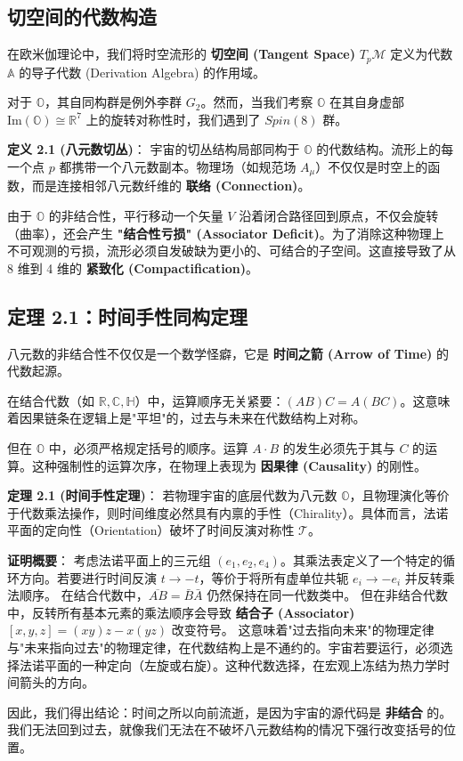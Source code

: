\subsection{切空间的代数构造}

在欧米伽理论中，我们将时空流形的 \textbf{切空间 (Tangent Space)} $T_p \mathcal{M}$ 定义为代数 $\mathbb{A}$ 的导子代数 (Derivation Algebra) 的作用域。

对于 $\mathbb{O}$，其自同构群是例外李群 $G_2$。然而，当我们考察 $\mathbb{O}$ 在其自身虚部 $\text{Im}(\mathbb{O}) \cong \mathbb{R}^7$ 上的旋转对称性时，我们遇到了 $Spin(8)$ 群。

\textbf{定义 2.1 (八元数切丛)}：
宇宙的切丛结构局部同构于 $\mathbb{O}$ 的代数结构。流形上的每一个点 $p$ 都携带一个八元数副本。物理场（如规范场 $A_\mu$）不仅仅是时空上的函数，而是连接相邻八元数纤维的 \textbf{联络 (Connection)}。

由于 $\mathbb{O}$ 的非结合性，平行移动一个矢量 $V$ 沿着闭合路径回到原点，不仅会旋转（曲率），还会产生 \textbf{"结合性亏损" (Associator Deficit)}。为了消除这种物理上不可观测的亏损，流形必须自发破缺为更小的、可结合的子空间。这直接导致了从 8 维到 4 维的 \textbf{紧致化 (Compactification)}。

\subsection{定理 2.1：时间手性同构定理}

八元数的非结合性不仅仅是一个数学怪癖，它是 \textbf{时间之箭 (Arrow of Time)} 的代数起源。

在结合代数（如 $\mathbb{R}, \mathbb{C}, \mathbb{H}$）中，运算顺序无关紧要：$(AB)C = A(BC)$。这意味着因果链条在逻辑上是"平坦"的，过去与未来在代数结构上对称。

但在 $\mathbb{O}$ 中，必须严格规定括号的顺序。运算 $A \cdot B$ 的发生必须先于其与 $C$ 的运算。这种强制性的运算次序，在物理上表现为 \textbf{因果律 (Causality)} 的刚性。

\textbf{定理 2.1 (时间手性定理)}：
若物理宇宙的底层代数为八元数 $\mathbb{O}$，且物理演化等价于代数乘法操作，则时间维度必然具有内禀的手性（Chirality）。具体而言，法诺平面的定向性（Orientation）破坏了时间反演对称性 $\mathcal{T}$。

\textbf{证明概要}：
考虑法诺平面上的三元组 $(e_1, e_2, e_4)$。其乘法表定义了一个特定的循环方向。若要进行时间反演 $t \to -t$，等价于将所有虚单位共轭 $e_i \to -e_i$ 并反转乘法顺序。
在结合代数中，$\overline{AB} = \bar{B}\bar{A}$ 仍然保持在同一代数类中。
但在非结合代数中，反转所有基本元素的乘法顺序会导致 \textbf{结合子 (Associator)} $[x,y,z] = (xy)z - x(yz)$ 改变符号。
这意味着"过去指向未来"的物理定律与"未来指向过去"的物理定律，在代数结构上是不通约的。宇宙若要运行，必须选择法诺平面的一种定向（左旋或右旋）。这种代数选择，在宏观上冻结为热力学时间箭头的方向。

因此，我们得出结论：时间之所以向前流逝，是因为宇宙的源代码是 \textbf{非结合} 的。我们无法回到过去，就像我们无法在不破坏八元数结构的情况下强行改变括号的位置。
